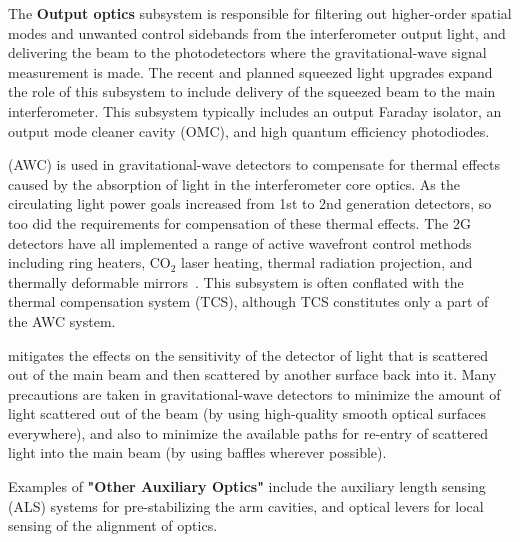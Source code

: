 The {\bf Output optics} subsystem is responsible for filtering out higher-order spatial modes and unwanted control sidebands from the interferometer output light, and delivering the beam to the photodetectors where the gravitational-wave signal measurement is made. The recent and planned squeezed light upgrades expand the role of this subsystem to include delivery of the squeezed beam to the main interferometer. This subsystem typically includes an output Faraday isolator, an output mode cleaner cavity (OMC), and high quantum efficiency photodiodes.

 (AWC) is used in gravitational-wave detectors to compensate for thermal effects caused by the absorption of light in the interferometer core optics. As the circulating light power goals increased from 1st to 2nd generation detectors, so too did the requirements for compensation of these thermal effects. The 2G detectors have all implemented a range of active wavefront control methods including ring heaters, CO$_2$ laser heating, thermal radiation projection, and thermally deformable mirrors~\cite{aLIGO_AWC, AdVirgo_IO}. This subsystem is often conflated with the thermal compensation system (TCS), although TCS constitutes only a part of the AWC system. 

mitigates the effects on the sensitivity of the detector of light that is scattered out of the main beam and then scattered by another surface back into it. 
Many precautions are taken in gravitational-wave detectors to minimize the amount of light scattered out of the beam (by using high-quality smooth optical surfaces everywhere), and also to minimize the available paths for re-entry of scattered light into the main beam (by using baffles wherever possible). 

\noindent 
Examples of {\bf "Other Auxiliary Optics"} include the auxiliary length sensing (ALS) systems for pre-stabilizing the arm cavities, and optical levers for local sensing of the alignment of optics.

